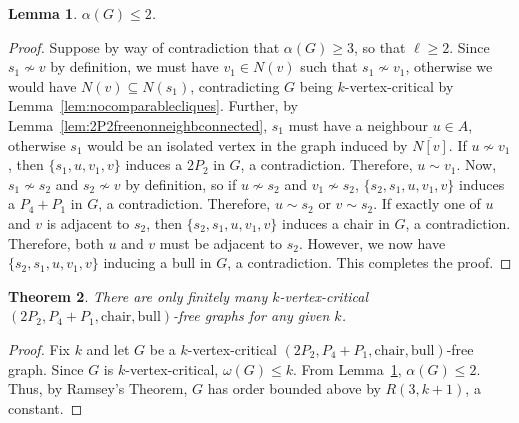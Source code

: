 \documentclass[11pt]{article}
\newtheorem{theorem}{Theorem}[section]
\newtheorem{lemma}[theorem]{Lemma}
\theoremstyle{definition}
\newcommand{\noneighbs}{\overline{N[v]}}
\begin{document}
\begin{lemma}\label{lem:indnumatmost2bullchair}
$\alpha(G)\le 2$.
\end{lemma}
\begin{proof}
Suppose by way of contradiction that $\alpha(G)\ge 3$, so that $\ell\ge 2$. Since $s_1\nsim v$ by definition, we must have $v_1\in N(v)$ such that $s_1\nsim v_1$, otherwise we would have $N(v)\subseteq N(s_1)$, contradicting $G$ being $k$-vertex-critical by Lemma~\ref{lem:nocomparablecliques}. Further, by Lemma~\ref{lem:2P2freenonneighbconnected}, $s_1$ must have a neighbour $u\in A$, otherwise $s_1$ would be an isolated vertex in the graph induced by $\noneighbs$. If $u\nsim v_1$, then $\{s_1,u,v_1,v\}$ induces a $2P_2$ in $G$, a contradiction. Therefore, $u\sim v_1$. Now, $s_1\nsim s_2$ and $s_2\nsim v$ by definition, so if $u\nsim s_2$ and $v_1\nsim s_2$, $\{s_2,s_1,u,v_1,v\}$ induces a $P_4+P_1$ in $G$, a contradiction. Therefore, $u\sim s_2$ or $v\sim s_2$. If exactly one of $u$ and $v$ is adjacent to $s_2$, then $\{s_2,s_1,u,v_1,v\}$ induces a chair in $G$, a contradiction. Therefore, both $u$ and $v$ must be adjacent to $s_2$. However, we now have $\{s_2,s_1,u,v_1,v\}$ inducing a bull in $G$, a contradiction. This completes the proof.
\end{proof}

\begin{theorem}
There are only finitely many $k$-vertex-critical $(2P_2, P_4 + P_1,\text{chair}, \text{bull})$-free graphs for any given $k$.
\end{theorem}
\begin{proof}
Fix $k$ and let $G$ be a $k$-vertex-critical $(2P_2, P_4 + P_1,\text{chair}, \text{bull})$-free graph. Since $G$ is $k$-vertex-critical, $\omega(G)\le k$. From Lemma~\ref{lem:indnumatmost2bullchair}, $\alpha(G)\le 2$. Thus, by Ramsey's Theorem, $G$ has order bounded above by $R(3,k+1)$, a constant.
\end{proof}
\end{document}
